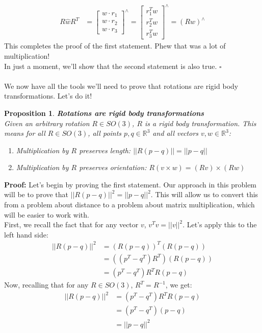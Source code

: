 \documentclass[oneside]{book}
\newtheorem{proposition}{Proposition}
\newenvironment{prop} %
  {\colorlet{shadecolor}{blue!9}\begin{shaded}\begin{proposition}}
  {\end{proposition}\end{shaded}}
\begin{document}
\begin{align}
     R\hat{w}R^T &= \begin{bmatrix}
     w \cdot r_1\\
     w \cdot r_2\\
     w \cdot r_3
     \end{bmatrix}^\wedge
     = \begin{bmatrix}
     r_1^T w \\
     r_2^T w \\
     r_3^T w 
     \end{bmatrix}^\wedge
     = (Rw)^\wedge
\end{align}
This completes the proof of the first statement. Phew that was a lot of multiplication! \\
In just a moment, we'll show that the second statement is also true. $\square$\\\\
We now have all the tools we'll need to prove that rotations are rigid body transformations. Let's do it!
\begin{prop}
\textbf{Rotations are rigid body transformations}\\
Given an arbitrary rotation $R \in SO(3)$, $R$ is a rigid body transformation. This means for all $R \in SO(3)$, all points $p, q\in \mathbb{R}^3$ and all vectors $v, w\in \mathbb{R}^3$:
\begin{enumerate}
    \item Multiplication by $R$ preserves length: $||R(p-q)|| = ||p - q||$
    \item Multiplication by $R$ preserves orientation: $R(v\times w) = (Rv)\times(Rw)$
\end{enumerate}
\end{prop}\noindent
\textbf{Proof:} Let's begin by proving the first statement. Our approach in this problem will be to prove that $||R(p-q)||^2 = ||p - q||^2$. This will allow us to convert this from a problem about distance to a problem about matrix multiplication, which will be easier to work with.\\
First, we recall the fact that for any vector $v$, $v^Tv = ||v||^2$. Let's apply this to the left hand side:
\begin{align}
    ||R(p-q)||^2 &= (R(p-q))^T(R(p-q))\\
    &= ((p^T-q^T)R^T)(R(p-q))\\
    &= (p^T-q^T)R^TR(p-q)
\end{align}
Now, recalling that for any $R\in SO(3)$, $R^T = R^{-1}$, we get:
\begin{align}
    ||R(p-q)||^2 &= (p^T-q^T)R^TR(p-q)\\
    &= (p^T-q^T)(p-q)\\
    &= ||p-q||^2
\end{align}
\end{document}
